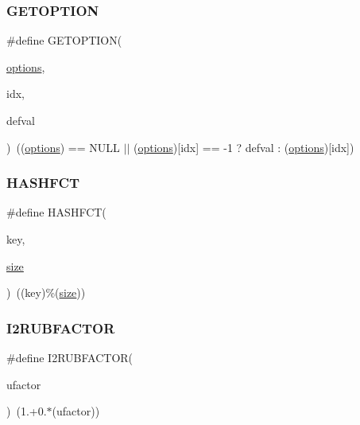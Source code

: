 \subsubsection{\texorpdfstring{G\+E\+T\+O\+P\+T\+I\+ON}{GETOPTION}}
{\footnotesize\ttfamily \#define G\+E\+T\+O\+P\+T\+I\+ON(\begin{DoxyParamCaption}\item[{}]{\hyperlink{a00879_a68c032ed4161802775c6847d4cb39adf}{options},  }\item[{}]{idx,  }\item[{}]{defval }\end{DoxyParamCaption})~((\hyperlink{a00879_a68c032ed4161802775c6847d4cb39adf}{options}) == N\+U\+LL $\vert$$\vert$ (\hyperlink{a00879_a68c032ed4161802775c6847d4cb39adf}{options})\mbox{[}idx\mbox{]} == -\/1 ? defval \+: (\hyperlink{a00879_a68c032ed4161802775c6847d4cb39adf}{options})\mbox{[}idx\mbox{]})}

\mbox{\label{a00921_aad4ca8af06a4e7cde40c07e0d3f0e17a}} 
\subsubsection{\texorpdfstring{H\+A\+S\+H\+F\+CT}{HASHFCT}}
{\footnotesize\ttfamily \#define H\+A\+S\+H\+F\+CT(\begin{DoxyParamCaption}\item[{}]{key,  }\item[{}]{\hyperlink{a00611_ad6cb0afbbe6ea4f56407890be2533966}{size} }\end{DoxyParamCaption})~((key)\%(\hyperlink{a00611_ad6cb0afbbe6ea4f56407890be2533966}{size}))}

\mbox{\label{a00921_aadb39d34d0d98e7fca3f188f6b75df20}} 
\subsubsection{\texorpdfstring{I2\+R\+U\+B\+F\+A\+C\+T\+OR}{I2RUBFACTOR}}
{\footnotesize\ttfamily \#define I2\+R\+U\+B\+F\+A\+C\+T\+OR(\begin{DoxyParamCaption}\item[{}]{ufactor }\end{DoxyParamCaption})~(1.+0.$\ast$(ufactor))}

